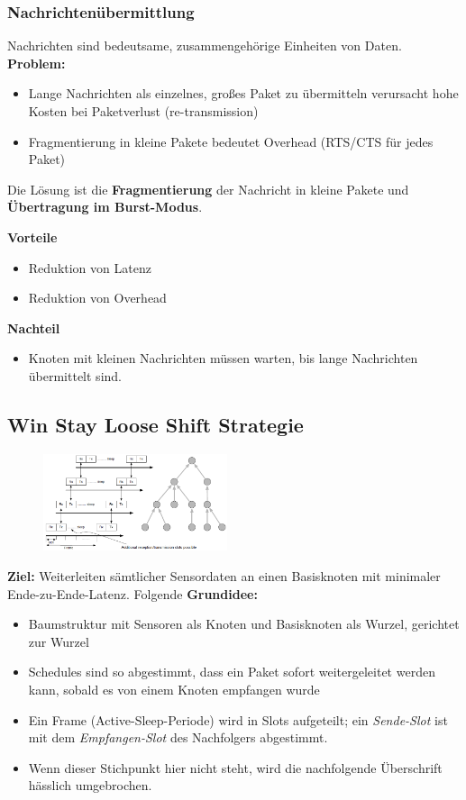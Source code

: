 \documentclass{article} %
\begin{document}
\subsubsection{Nachrichtenübermittlung}
Nachrichten sind bedeutsame, zusammengehörige Einheiten von Daten.
\textbf{Problem:}
\begin{itemize}
	\item Lange Nachrichten als einzelnes, großes Paket zu übermitteln verursacht hohe Kosten bei Paketverlust (re-transmission)
	\item Fragmentierung in kleine Pakete bedeutet Overhead (RTS/CTS für jedes Paket)
\end{itemize}
Die Lösung ist die \textbf{Fragmentierung} der Nachricht in kleine Pakete und \textbf{Übertragung im Burst-Modus}.
\begin{multicols}{2}
	\textbf{Vorteile}
	\begin{itemize}
		\item Reduktion von Latenz
		\item Reduktion von Overhead
	\end{itemize}
	\textbf{Nachteil}
	\begin{itemize}
		\item Knoten mit kleinen Nachrichten müssen warten, bis lange Nachrichten übermittelt sind.
	\end{itemize}
\end{multicols}
\subsection{Win Stay Loose Shift Strategie}
\begin{figure}
\includegraphics*[width=0.48\textwidth]{img/d-mac}
\end{figure}

\textbf{Ziel:} Weiterleiten sämtlicher Sensordaten an einen Basisknoten mit minimaler Ende-zu-Ende-Latenz.
Folgende \textbf{Grundidee:}
\begin{itemize}
	\item Baumstruktur mit Sensoren als Knoten und Basisknoten als Wurzel, gerichtet zur Wurzel
	\item Schedules sind so abgestimmt, dass ein Paket sofort weitergeleitet werden kann, sobald es von einem Knoten empfangen wurde
	\item Ein Frame (Active-Sleep-Periode) wird in Slots aufgeteilt; ein \emph{Sende-Slot} ist mit dem \emph{Empfangen-Slot} des Nachfolgers abgestimmt.
	\item Wenn dieser Stichpunkt hier nicht steht, wird die nachfolgende Überschrift hässlich umgebrochen.
\end{itemize}
\end{document}
